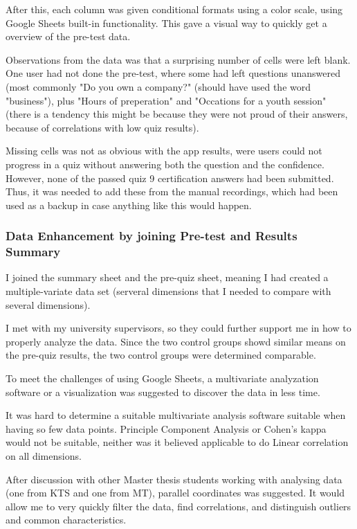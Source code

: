 After this, each column was given conditional formats using a color scale, using Google Sheets built-in functionality. This gave a visual way to quickly get a overview of the pre-test data.

Observations from the data was that a surprising number of cells were left blank. One user had not done the pre-test, where some had left questions unanswered (most commonly "Do you own a company?" (should have used the word "business"), plus "Hours of preperation" and "Occations for a youth session" (there is a tendency this might be because they were not proud of their answers, because of correlations with low quiz results).

Missing cells was not as obvious with the app results, were users could not progress in a quiz without answering both the question and the confidence. However, none of the passed quiz 9 certification answers had been submitted. Thus, it was needed to add these from the manual recordings, which had been used as a backup in case anything like this would happen.

\subsubsection{Data Enhancement by joining Pre-test and Results Summary}

I joined the summary sheet and the pre-quiz sheet, meaning I had created a multiple-variate data set (serveral dimensions that I needed to compare with several dimensions).

I met with my university supervisors, so they could further support me in how to properly analyze the data. Since the two control groups showd similar means on the pre-quiz results, the two control groups were determined comparable.

To meet the challenges of using Google Sheets, a multivariate analyzation software or a visualization was suggested to discover the data in less time.

It was hard to determine a suitable multivariate analysis software suitable when having so few data points. Principle Component Analysis or Cohen's kappa would not be suitable, neither was it believed applicable to do Linear correlation on all dimensions.

After discussion with other Master thesis students working with analysing data (one from KTS and one from MT), parallel coordinates was suggested. It would allow me to very quickly filter the data, find correlations, and distinguish outliers and common characteristics.

